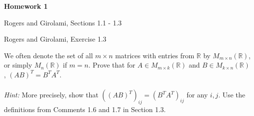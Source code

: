 \documentclass{article}
\newcommand{\R}{\mathbb{R}}
\newenvironment{envsection}[1]{\begin{trivlist}
\item[\hskip \labelsep {\bfseries #1}]}{\end{trivlist}}
\begin{document}
\setlength{\abovedisplayskip}{4pt}
\setlength{\belowdisplayskip}{4pt}


\begin{center}
    \Large{\textbf{Homework 1}}
\end{center}
\vspace{10pt}

\begin{envsection}{Read.}
    Rogers and Girolami, Sections 1.1 - 1.3  
\end{envsection}

\begin{envsection}{Problem 1.}
    Rogers and Girolami, Exercise 1.3
\end{envsection}

\begin{envsection}{Problem 2 (Matrix Transposes).}
    We often denote the set of all $m \times n$ matrices with entries from $\R$ by $M_{m \times n}(\R)$, or simply $M_n(\R)$ if $m=n$. Prove that for $A \in M_{m \times k}(\R)$ and $B \in M_{k \times n}(\R)$, $(AB)^T = B^TA^T$.\\
    \\
    \textit{Hint:} More precisely, show that $((AB)^T)_{ij} = (B^TA^T)_{ij}$ for any $i,j$. Use the definitions from Comments 1.6 and 1.7 in Section 1.3.
\end{envsection}
\end{document}
